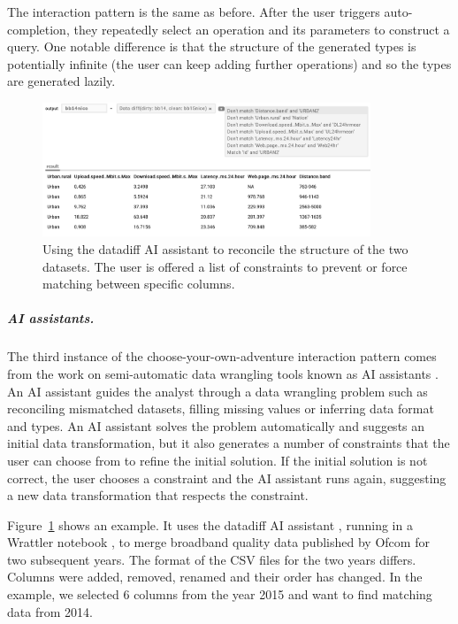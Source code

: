 \documentclass[ a4paper,UKenglish,cleveref, autoref, thm-restate]{lipics-v2021}
\begin{document}
The interaction pattern is the same as before. After the user triggers auto-completion, they
repeatedly select an operation and its parameters to construct a query. One notable difference
is that the structure of the generated types is potentially infinite (the user can keep adding
further operations) and so the types are generated lazily.

\begin{figure}[t]
  \vspace{-0.5em}
  \includegraphics[width=0.875\textwidth]{fig/aia.png}
  \caption{Using the datadiff AI assistant to reconcile the structure of the two datasets.
    The user is offered a list of constraints to prevent or force matching between specific columns.}
  \label{fig:aia}
\end{figure}


\subparagraph{AI assistants.}

The third instance of the choose-your-own-adventure interaction pattern comes from the work on
semi-automatic data wrangling tools known as AI assistants \cite{petricek-2023-aias}.
An AI assistant guides the analyst through a data wrangling problem such as reconciling mismatched
datasets, filling missing values or inferring data format and types. An AI assistant solves
the problem automatically and suggests an initial data transformation, but it also generates a
number of constraints that the user can choose from to refine the initial solution. If the initial
solution is not correct, the user chooses a constraint and the AI assistant runs again, suggesting
a new data transformation that respects the constraint.

Figure~\ref{fig:aia} shows an example. It uses the datadiff AI assistant \cite{sutton-2018-datadiff},
running in a Wrattler notebook \cite{petricek-2018-wrattler}, to merge broadband
quality data published by Ofcom for two subsequent years. The format of the CSV files for the
two years differs. Columns were added, removed, renamed and their order has changed. In the
example, we selected 6 columns from the year 2015 and want to find matching data from 2014.
\end{document}
